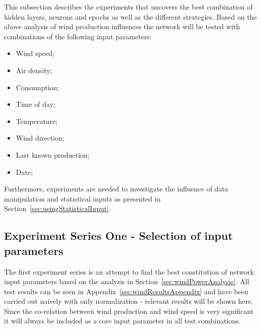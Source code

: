 This subsection describes the experiments that uncovers the best combination of hidden layers, neurons and epochs as well as the different strategies. Based on the above analysis of wind production influences the network will be tested with combinations of the following input parameters:

\begin{itemize}
\item Wind speed;
\item Air density;
\item Consumption;
\item Time of day;
\item Temperature;
\item Wind direction;
\item Last known production;
\item Date;
\end{itemize}

Furthermore, experiments are needed to investigate the influence of data manipulation and statistical inputs as presented in Section~\ref{sec:usingStatisticalInput}. 


\subsection{Experiment Series One - Selection of input parameters}
The first experiment series is an attempt to find the best constitution of network input parameters based on the analysis in Section~\ref{sec:windPowerAnalysis}. All test results can be seen in Appendix~\ref{sec:windResultsAppendix} and have been carried out naively with only normalization - relevant results will be shown here. Since the co-relation between wind production and wind speed is very significant it will always be included as a core input parameter in all test combinations.

